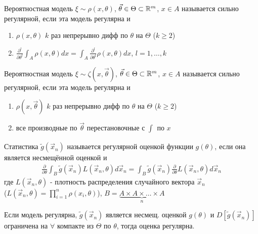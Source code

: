 \documentclass{article}
\begin{document}
\begin{definition}
  Вероятностная модель $\xi\sim\rho(x,\theta)$,  $\vec{\theta}\in\Theta\subset \mathbb{R}^{m}$, $x\in A$
  называется сильно регулярной, если эта модель регулярна и
  \begin{enumerate}
    \item $\rho(x,\theta)$ $k$ раз непрерывно дифф по $\theta$ на $\Theta$ ($k\ge 2$)
    \item $\frac{\partial^{l}}{\partial\theta^{l}}\int_{A}^{}\rho(x,\theta)dx=\int_{A}^{}\frac{\partial^{l}}{\partial\theta^{l}}\rho(x,\theta)dx$, $l=1,\dots ,k$
  \end{enumerate}
\end{definition}
\begin{definition}
  Вероятностная модель $\xi\sim \zeta(x,\vec{\theta})$, $\vec{\theta}\in\Theta\subset \mathbb{R}^{m}$, $x\in A$
  называется сильно регулярной, если эта модель регулярна и
  \begin{enumerate}
    \item $\rho(x,\vec{\theta})$ $k$ раз непрерывно дифф по $\theta$ на $\Theta$ ($k\ge 2$)
    \item все производные по $\vec{\theta}$ перестановочные с $\int_{}^{}$ по $x$
  \end{enumerate}
\end{definition}

\begin{definition}
  Статистика $\tilde{g}(\vec{x}_n)$ называется регулярной оценкой функции $g(\theta)$,
  если она является несмещённой оценкой и 
  \begin{gather*}
    \frac{\partial}{\partial\theta}\int_{B}^{}\tilde{g}(\vec{x}_n)L(\vec{x}_n,\theta)d\vec{x}_n=
    \int_{B}^{}\tilde{g}(\vec{x}_n)\frac{\partial}{\partial \theta}L(\vec{x}_n,\theta)d\vec{x}_n
  \end{gather*}
  где $L(\vec{x}_n,\theta)$ - плотность распределения случайного вектора $\vec{x}_n$ \\ 
  ($L(\vec{x}_n,\theta)=\prod_{i=1}^{n}\rho(x_i,\theta)$), $B=\underbrace{A\times A\times\dots \times A}_{n}$
\end{definition}
\begin{theorem}
  Если модель регулярна, $\tilde{g}(\vec{x}_n)$ является несмещ. оценкой $g(\theta)$
  и $D[\tilde{g}(\vec{x}_n)]$ ограничена на $\forall$ компакте из $\Theta$ по $\theta$,
  тогда оценка регулярна.
\end{theorem}

\end{document}
